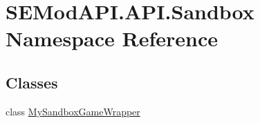 \hypertarget{namespace_s_e_mod_a_p_i_1_1_a_p_i_1_1_sandbox}{}\section{S\+E\+Mod\+A\+P\+I.\+A\+P\+I.\+Sandbox Namespace Reference}
\label{namespace_s_e_mod_a_p_i_1_1_a_p_i_1_1_sandbox}
\subsection*{Classes}
\begin{DoxyCompactItemize}
\item 
class \hyperlink{class_s_e_mod_a_p_i_1_1_a_p_i_1_1_sandbox_1_1_my_sandbox_game_wrapper}{My\+Sandbox\+Game\+Wrapper}
\end{DoxyCompactItemize}
